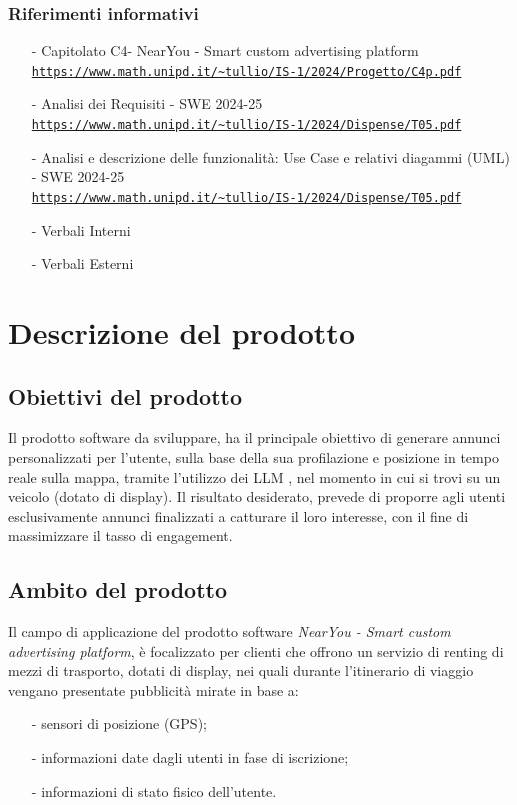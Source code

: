 \documentclass[11pt]{article}
\begin{document}
\begin{justify}
\subsubsection{Riferimenti informativi}
\begin{itemize}
    \item[-] Capitolato C4- NearYou - 
Smart custom advertising platform\\
    \textcolor{blue}{\texttt{\url{https://www.math.unipd.it/~tullio/IS-1/2024/Progetto/C4p.pdf}}}
    \item[-] Analisi dei Requisiti - SWE 2024-25\\
    \textcolor{blue}{\texttt{\url{https://www.math.unipd.it/~tullio/IS-1/2024/Dispense/T05.pdf}}}
    \item[-] Analisi e descrizione delle funzionalità: Use Case e relativi diagammi (UML) - SWE 2024-25\\
    \textcolor{blue}{\texttt{\url{https://www.math.unipd.it/~tullio/IS-1/2024/Dispense/T05.pdf}}}
    \item[-] Verbali Interni
    \item[-] Verbali Esterni
    
    

\end{itemize}

\newpage
\section{Descrizione del prodotto}
\subsection{Obiettivi del prodotto}

Il prodotto software da sviluppare, ha il principale obiettivo di generare annunci personalizzati per l'utente, sulla base della sua profilazione e posizione in tempo reale sulla mappa, tramite l'utilizzo dei LLM , nel momento in cui si trovi su un veicolo (dotato di display). Il risultato desiderato, prevede di proporre agli utenti esclusivamente annunci finalizzati a catturare il loro interesse, con il fine di massimizzare il tasso di engagement.
\subsection{Ambito del prodotto}
Il campo di applicazione del prodotto software \textit{NearYou - 
Smart custom advertising platform}, è focalizzato per clienti che offrono un servizio di renting di mezzi di trasporto, dotati di display, nei quali durante l'itinerario di viaggio vengano presentate pubblicità mirate in base a:
\begin{itemize}
    \item [-] sensori di posizione (GPS);
    \item [-] informazioni date dagli utenti in fase di iscrizione;
    \item [-] informazioni di stato fisico dell’utente.
\end{itemize}


\end{justify}
\end{document}
